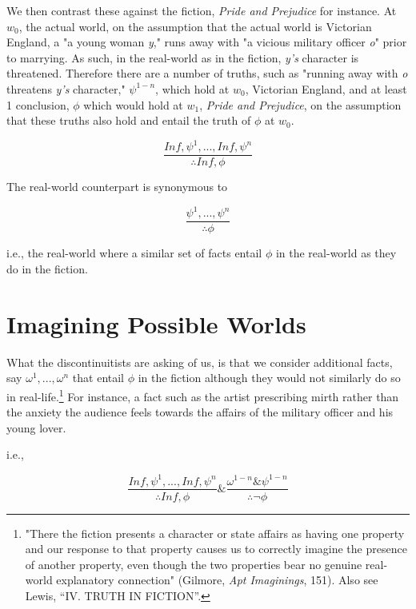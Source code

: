 \documentclass[
  12pt,
]{book}
\theoremstyle{definition}
\theoremstyle{definition}
\theoremstyle{definition}
\theoremstyle{definition}
\theoremstyle{remark}
\begin{document}
We then contrast these against the fiction, \emph{Pride and Prejudice} for instance. At \(w_{0}\), the actual world, on the assumption that the actual world is Victorian England, a "a young woman \emph{y}," runs away with "a vicious military officer \emph{o}" prior to marrying. As such, in the real-world as in the fiction, \emph{y's} character is threatened. Therefore there are a number of truths, such as "running away with \emph{o} threatens \emph{y's} character," \(\psi^{1-n}\), which hold at \(w_{0}\), Victorian England, and at least 1 conclusion, \(\phi\) which would hold at \(w_{1}\), \emph{Pride and Prejudice}, on the assumption that these truths also hold and entail the truth of \(\phi\) at \(w_{0}\).

\[\frac{In f, \psi^{1}, . . ., In f, \psi^{n}}{\therefore In f, \phi}\]

\noindent The real-world counterpart is synonymous to

\[\frac{\psi^{1}, . . ., \psi^{n}}{\therefore\phi}\]

\noindent i.e., the real-world where a similar set of facts entail \(\phi\) in the real-world as they do in the fiction.

\section{Imagining Possible Worlds}\label{imagining-possible-worlds}

What the discontinuitists are asking of us, is that we consider additional facts, say \(\omega^{1}, . . ., \omega^{n}\) that entail \(\phi\) in the fiction although they would not similarly do so in real-life.\footnote{"There the fiction presents a character or state affairs as having one property and our response to that property causes us to correctly imagine the presence of another property, even though the two properties bear no genuine real-world explanatory connection" (Gilmore, \emph{Apt {Imaginings}}, 151). Also see Lewis, {``{IV}. {TRUTH IN FICTION}''}.} For instance, a fact such as the artist prescribing mirth rather than the anxiety the audience feels towards the affairs of the military officer and his young lover.

\noindent i.e.,

\[\frac{In f, \psi^{1}, . . ., In f, \psi^{n}}{\therefore In f, \phi} \& \frac{\omega^{1-n} \& \psi^{1-n}}{\therefore\neg\phi}\]
\end{document}

